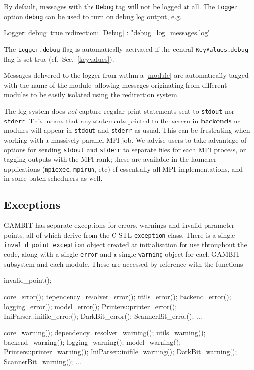 \documentclass[pdftex,twocolumn,epjc3_preprint,runningheads]{svjour3}
\renewcommand{\_}{\discretionary{\underscore}{}{\underscore}}
\newcommand\cpp[1]{{\lstinline!#1!}}  %
\newcommand\yaml[1]{{\lstset{style=yaml}\lstinline!#1!\lstset{style=cpp}}}
\newcommand\term[1]{{\lstset{style=terminal}\lstinline!#1!\lstset{style=cpp}}}
\newcommand{\cross}[1]{\ref{#1}}
\newcommand{\doublecross}[2]{\hyperref[#2]{\textbf{#1}}}
\newcommand{\gambit}{\textsf{GAMBIT}\xspace}
\newcommand{\GB}{\gambit}
\newcommand{\mpi}{\textsf{MPI}\xspace}
\newcommand\xx{\raisebox{0.2ex}{\smaller ++}\xspace}
\newcommand\Cpp{\textsf{C\xx}\xspace}
\begin{document}
By default, messages with the \yaml{Debug} tag will not be logged at all.  The \yaml{Logger} option \yaml{debug} can be used to turn on debug log output, e.g.
\begin{lstyaml}
Logger:
  debug: true
  redirection:
    [Debug]     : "debug_log_messages.log"
\end{lstyaml}
The \yaml{Logger:debug} flag is automatically activated if the central \yaml{KeyValues:debug} flag is set true (cf.\ Sec.\ \ref{keyvalues}).

Messages delivered to the logger from within a \cross{module} are automatically tagged with the name of the module, allowing messages originating from different modules to be easily isolated using the redirection system.

The log system does \textit{not} capture regular print statements sent to \term{stdout} nor \term{stderr}.  This means that any statements printed to the screen in \doublecross{backends}{backend} or modules will appear in \term{stdout} and \term{stderr} as usual. This can be frustrating when working with a massively parallel \mpi job.  We advise users to take advantage of options for sending \term{stdout} and \term{stderr} to separate files for each \mpi process, or tagging outputs with the \mpi rank; these are available in the launcher applications (\term{mpiexec}, \term{mpirun}, etc) of essentially all \mpi implementations, and in some batch schedulers as well.

\subsection{Exceptions}
\label{exceptions}

\GB has separate exceptions for errors, warnings and invalid parameter points, all of which derive from the \Cpp STL \cpp{exception} class.  There is a single
\lstinline{invalid_point_exception} object created at initialisation for use throughout the code, along with a single \lstinline{error} and a single \lstinline{warning} object for each \GB subsystem and each module.  These are accessed by reference with the functions
\begin{lstcpp}
invalid_point();

core_error();
dependency_resolver_error();
utils_error();
backend_error();
logging_error();
model_error();
Printers::printer_error();
IniParser::inifile_error();
DarkBit_error();
ScannerBit_error();
...

core_warning();
dependency_resolver_warning();
utils_warning();
backend_warning();
logging_warning();
model_warning();
Printers::printer_warning();
IniParser::inifile_warning();
DarkBit_warning();
ScannerBit_warning();
...
\end{lstcpp}
\end{document}
